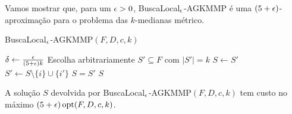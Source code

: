 Vamos mostrar que, para um $\epsilon > 0$, {\sc BuscaLocal$_\epsilon$-AGKMMP} é uma $(5 + \epsilon)$-aproximação para o problema das $k$-medianas métrico.
\begin{algorithm}[H]
    \caption{\sc BuscaLocal$_\epsilon$-AGKMMP$(F,D,c,k)$}
    \begin{algorithmic}[1]
        \State $\delta \gets \frac{\epsilon}{(5+\epsilon)k}$
        \State Escolha arbitrariamente $S' \subseteq F$ com $|S'| = k$
        \Repeat
        \State $S\gets S'$
        \State $S' \gets S \setminus \{i\} \cup \{i'\}$
        \EndIf
        \Until $S=S'$
        \State \Return $S$
    \end{algorithmic}
\end{algorithm}

\begin{theorem}
    A solução $S$ devolvida por {\sc BuscaLocal$_\epsilon$-AGKMMP$(F,D,c,k)$} tem custo no máximo $(5+\epsilon)\,\mathrm{opt}(F,D,c,k)$.
\end{theorem}

